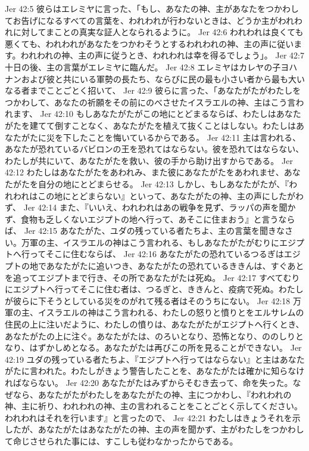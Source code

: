 Jer 42:5  彼らはエレミヤに言った、「もし、あなたの神、主があなたをつかわしてお告げになるすべての言葉を、われわれが行わないときは、どうか主がわれわれに対してまことの真実な証人となられるように。
Jer 42:6  われわれは良くても悪くても、われわれがあなたをつかわそうとするわれわれの神、主の声に従います。われわれの神、主の声に従うとき、われわれは幸を得るでしょう」。
Jer 42:7  十日の後、主の言葉がエレミヤに臨んだ。
Jer 42:8  エレミヤはカレヤの子ヨハナンおよび彼と共にいる軍勢の長たち、ならびに民の最も小さい者から最も大いなる者までことごとく招いて、
Jer 42:9  彼らに言った、「あなたがたがわたしをつかわして、あなたの祈願をその前にのべさせたイスラエルの神、主はこう言われます、
Jer 42:10  もしあなたがたがこの地にとどまるならば、わたしはあなたがたを建てて倒すことなく、あなたがたを植えて抜くことはしない。わたしはあなたがたに災を下したことを悔いているからである。
Jer 42:11  主は言われる、あなたが恐れているバビロンの王を恐れてはならない。彼を恐れてはならない、わたしが共にいて、あなたがたを救い、彼の手から助け出すからである。
Jer 42:12  わたしはあなたがたをあわれみ、また彼にあなたがたをあわれませ、あなたがたを自分の地にとどまらせる。
Jer 42:13  しかし、もしあなたがたが、『われわれはこの地にとどまらない』といって、あなたがたの神、主の声にしたがわず、
Jer 42:14  また、『いいえ、われわれはあの戦争を見ず、ラッパの声を聞かず、食物も乏しくないエジプトの地へ行って、あそこに住まおう』と言うならば、
Jer 42:15  あなたがた、ユダの残っている者たちよ、主の言葉を聞きなさい。万軍の主、イスラエルの神はこう言われる、もしあなたがたがむりにエジプトへ行ってそこに住むならば、
Jer 42:16  あなたがたの恐れているつるぎはエジプトの地であなたがたに追いつき、あなたがたの恐れているききんは、すぐあとを追ってエジプトまで行き、その所であなたがたは死ぬ。
Jer 42:17  すべてむりにエジプトへ行ってそこに住む者は、つるぎと、ききんと、疫病で死ぬ。わたしが彼らに下そうとしている災をのがれて残る者はそのうちにない。
Jer 42:18  万軍の主、イスラエルの神はこう言われる、わたしの怒りと憤りとをエルサレムの住民の上に注いだように、わたしの憤りは、あなたがたがエジプトへ行くとき、あなたがたの上に注ぐ。あなたがたは、のろいとなり、恐怖となり、ののしりとなり、はずかしめとなる。あなたがたは再びこの所を見ることができない。
Jer 42:19  ユダの残っている者たちよ、『エジプトへ行ってはならない』と主はあなたがたに言われた。わたしがきょう警告したことを、あなたがたは確かに知らなければならない。
Jer 42:20  あなたがたはみずからそむき去って、命を失った。なぜなら、あなたがたがわたしをあなたがたの神、主につかわし、『われわれの神、主に祈り、われわれの神、主の言われることをことごとく示してください。われわれはそれを行います』と言ったので、
Jer 42:21  わたしはきょうそれを示したが、あなたがたはあなたがたの神、主の声を聞かず、主がわたしをつかわして命じさせられた事には、すこしも従わなかったからである。
